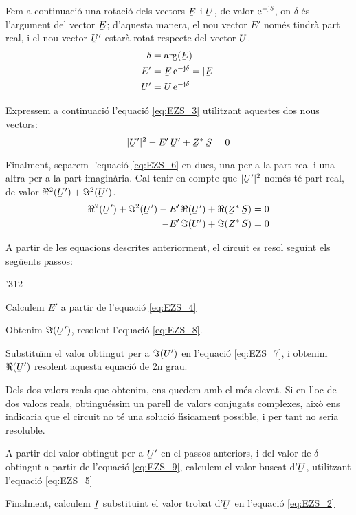 Fem a continuaci\'{o} una rotaci\'{o} dels vectors $\cmplx{E}$ i $\cmplx{U}$, de valor
$\mathrm{e}^{-\mathrm{j}\delta}$, on $\delta$ \'{e}s l'argument del vector $\cmplx{E}$; d'aquesta manera, el
nou vector $E'$ nom\'{e}s tindr\`{a} part real, i el nou vector $\cmplx{U}'$ estar\`{a} rotat respecte
del vector $\cmplx{U}$.
\begin{align}
   \delta &= \arg(\cmplx{E}) \label{eq:EZS_9} \\
   E' &= \cmplx{E} \, \eu^{-\ju\delta} = |\cmplx{E}|  \label{eq:EZS_4} \\
   \cmplx{U}' &= \cmplx{U} \, \eu^{-\ju\delta}   \label{eq:EZS_5}
\end{align}

Expressem a continuaci\'{o} l'equaci\'{o} \eqref{eq:EZS_3} utilitzant aquestes dos nous vectors:
\begin{equation}
   |\cmplx{U}'|^2 - E' \, \cmplx{U}' + \cmplx{Z}^* \, \cmplx{S} = 0 \label{eq:EZS_6}
\end{equation}

Finalment, separem l'equaci\'{o} \eqref{eq:EZS_6} en dues, una per a la part real i una altra per a la part imagin\`{a}ria. Cal tenir en compte que $|\cmplx{U}'|^2$ nom\'{e}s t\'{e} part real, de valor $\Re^2(\cmplx{U}') + \Im^2(\cmplx{U}')$.
\begin{align}
   \Re^2(\cmplx{U}') + \Im^2(\cmplx{U}') - E' \, \Re(\cmplx{U}') + \Re(\cmplx{Z}^* \, \cmplx{S}) &= 0 \label{eq:EZS_7} \\
   - E' \, \Im(\cmplx{U}') + \Im(\cmplx{Z}^* \, \cmplx{S}) &= 0 \label{eq:EZS_8}
\end{align}

A partir de les equacions descrites anteriorment, el circuit es resol seguint els seg\"{u}ents passos:
\begin{dingautolist}{'312}
   \item Calculem $E'$ a partir de l'equaci\'{o} \eqref{eq:EZS_4}
   \item Obtenim $\Im(\cmplx{U}')$, resolent l'equaci\'{o} \eqref{eq:EZS_8}.
   \item Substitu\"{\i}m el valor obtingut per a $\Im(\cmplx{U}')$ en l'equaci\'{o} \eqref{eq:EZS_7}, i obtenim $\Re(\cmplx{U}')$ resolent aquesta equaci\'{o} de 2n grau.
   \item Dels dos valors reals que obtenim, ens quedem amb el m\'{e}s elevat. Si en lloc de dos valors reals, obtingu\'{e}ssim un parell de valors conjugats complexes, aix\`{o} ens indicaria que el circuit no t\'{e} una soluci\'{o} f\'{\i}sicament possible, i per tant no seria resoluble.
   \item A partir del valor  obtingut per a $\cmplx{U}'$ en el passos anteriors, i del valor de $\delta$ obtingut a partir de l'equaci\'{o} \eqref{eq:EZS_9}, calculem el valor buscat d'$\cmplx{U}$, utilitzant l'equaci\'{o} \eqref{eq:EZS_5}
   \item Finalment, calculem $\cmplx{I}$ substituint el valor trobat d'$\cmplx{U}$ en l'equaci\'{o} \eqref{eq:EZS_2}
\end{dingautolist}

